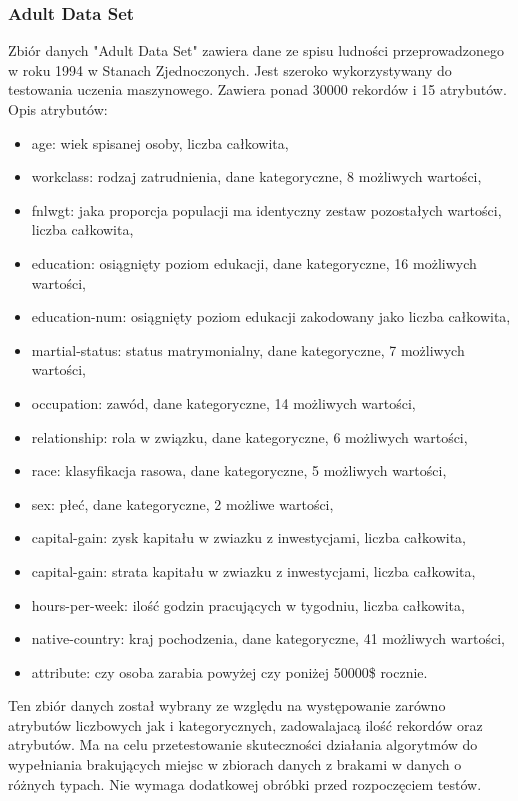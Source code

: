 \documentclass[12pt,twoside]{article}
\begin{document}
\subsubsection{Adult Data Set}

Zbiór danych "Adult Data Set" zawiera dane ze spisu ludności przeprowadzonego w roku 1994 w Stanach Zjednoczonych.
Jest szeroko wykorzystywany do testowania uczenia maszynowego.
Zawiera ponad 30000 rekordów i 15 atrybutów. \cite{adult} Opis atrybutów:
\begin{itemize}[label=-,labelsep=0.4cm, leftmargin=1.25cm]
    \item age: wiek spisanej osoby, liczba całkowita,
    \item workclass: rodzaj zatrudnienia, dane kategoryczne, 8 możliwych wartości,
    \item fnlwgt: jaka proporcja populacji ma identyczny zestaw pozostałych wartości, liczba całkowita,
    \item education: osiągnięty poziom edukacji, dane kategoryczne, 16 możliwych wartości,
    \item education-num: osiągnięty poziom edukacji zakodowany jako liczba całkowita,
    \item martial-status: status matrymonialny, dane kategoryczne, 7 możliwych wartości,
    \item occupation: zawód, dane kategoryczne, 14 możliwych wartości,
    \item relationship: rola w związku, dane kategoryczne, 6 możliwych wartości,
    \item race: klasyfikacja rasowa, dane kategoryczne, 5 możliwych wartości,
    \item sex: płeć, dane kategoryczne, 2 możliwe wartości,
    \item capital-gain: zysk kapitału w zwiazku z inwestycjami, liczba całkowita,
    \item capital-gain: strata kapitału w zwiazku z inwestycjami, liczba całkowita,
    \item hours-per-week: ilość godzin pracujących w tygodniu, liczba całkowita,
    \item native-country: kraj pochodzenia, dane kategoryczne, 41 możliwych wartości,
    \item attribute: czy osoba zarabia powyżej czy poniżej 50000\$ rocznie.
\end{itemize}
Ten zbiór danych został wybrany ze względu na występowanie zarówno atrybutów liczbowych jak i kategorycznych,
zadowalajacą ilość rekordów oraz atrybutów.
Ma na celu przetestowanie skuteczności działania algorytmów do wypełniania brakujących miejsc
w zbiorach danych z brakami w danych o różnych typach.
Nie wymaga dodatkowej obróbki przed rozpoczęciem testów. 
\end{document}
